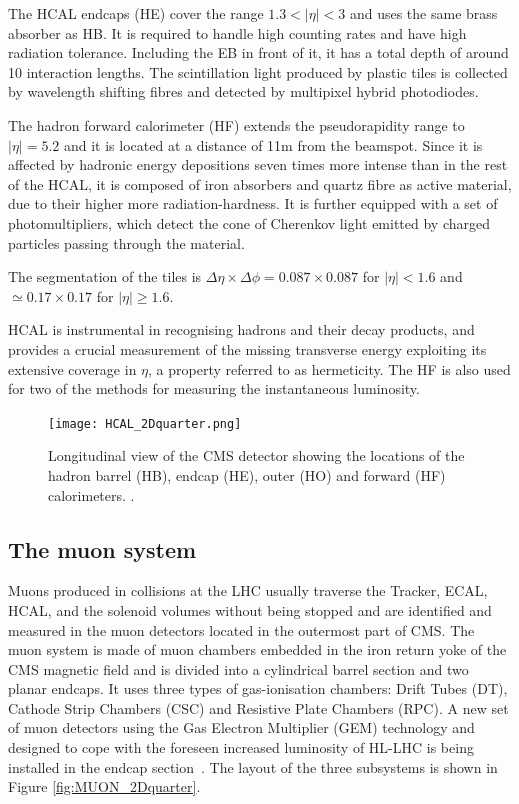 The HCAL endcaps (HE) cover the range $1.3 < |\eta| < 3$ and uses the same brass absorber as HB.
It is required to handle high counting rates and have high radiation tolerance.
Including the EB in front of it, it has a total depth of around 10 interaction lengths.
The scintillation light produced by plastic tiles is collected by wavelength shifting fibres and detected by multipixel hybrid photodiodes.

The hadron forward calorimeter (HF) extends the pseudorapidity range to $|\eta| = 5.2$ and it is located at a distance of 11\usep m from the beamspot.
Since it is affected by hadronic energy depositions seven times more intense than in the rest of the HCAL,
it is composed of iron absorbers and quartz fibre as active material, due to their higher more radiation-hardness.
It is further equipped with a set of photomultipliers, which detect the cone of Cherenkov light emitted by charged particles passing through the material.

The segmentation of the tiles is $\Delta \eta \times \Delta \phi = 0.087 \times 0.087$ for $|\eta| < 1.6$ and $\simeq 0.17 \times 0.17$ for $|\eta| \ge 1.6$.

HCAL is instrumental in recognising hadrons and their decay products,
and provides a crucial measurement of the missing transverse energy exploiting its extensive coverage in $\eta$, a property referred to as hermeticity.
The HF is also used for two of the methods for measuring the instantaneous luminosity.

\begin{figure}[thb]
  \centering
  \texttt{[image: HCAL\_2Dquarter.png]}
  \caption{Longitudinal view of the CMS detector showing the locations of the hadron barrel (HB), endcap (HE), outer (HO) and forward (HF) calorimeters. \cite{CMS:2008}.}
  \label{fig:HCAL_2Dquarter}
\end{figure}

\subsection{The muon system}
Muons produced in collisions at the LHC usually traverse the Tracker, ECAL, HCAL,
and the solenoid volumes without being stopped and are identified and measured in the muon detectors located in the outermost part of CMS.
The muon system is made of muon chambers embedded in the iron return yoke of the CMS magnetic field
and is divided into a cylindrical barrel section and two planar endcaps.
It uses three types of gas-ionisation chambers: Drift Tubes (DT), Cathode Strip Chambers (CSC) and Resistive Plate Chambers (RPC).
A new set of muon detectors using the Gas Electron Multiplier (GEM) technology
and designed to cope with the foreseen increased luminosity of HL-LHC is being installed in the endcap section~\cite{CMS-TDR-013}.
The layout of the three subsystems is shown in Figure \ref{fig:MUON_2Dquarter}.

